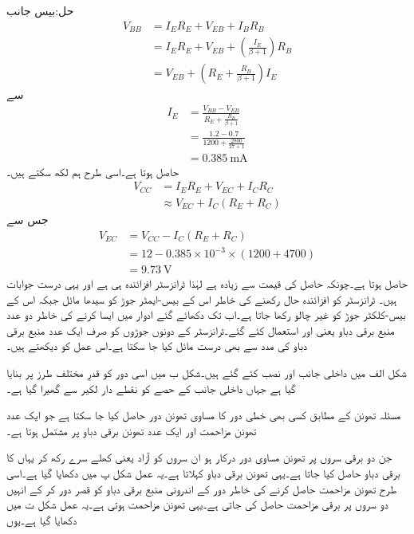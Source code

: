 حل:بیس جانب
\begin{align*}
V_{BB}&=I_E R_E+V_{EB}+I_B R_B\\
&=I_E R_E +V_{EB}+\left(\frac{I_E}{\beta+1} \right)R_B\\
&=V_{EB}+\left(R_E+\frac{R_B}{\beta+1} \right) I_E
\end{align*}
سے
\begin{align*}
I_E&=\frac{V_{BB}-V_{EB}}{R_E+\frac{R_B}{\beta+1}}\\
&=\frac{1.2-0.7}{1200+\frac{2800}{27+1}}\\
&=\SI{0.385}{\milli \ampere}
\end{align*}
حاصل ہوتا ہے۔اسی طرح ہم لکھ سکتے ہیں۔
\begin{align*}
V_{CC}&=I_E R_E +V_{EC}+I_C R_C\\
&\approx V_{EC}+I_C \left(R_E+R_C \right)
\end{align*}
جس سے
\begin{align*}
V_{EC}&=V_{CC}-I_C \left(R_E+R_C \right)\\
&=12-0.385 \times 10^{-3} \times \left(1200+4700 \right)\\
&=\SI{9.73}{\volt}
\end{align*}
حاصل ہوتا ہے۔چونکہ حاصل  کی قیمت  سے زیادہ ہے لہٰذا ٹرانزسٹر افزائندہ ہی ہے اور یہی درست جوابات ہیں۔ 
ٹرانزسٹر کو افزائندہ حال  رکھنے کی خاطر اس کے بیس-ایمٹر  جوڑ کو سیدھا مائل جبکہ اس کے بیس-کلکٹر جوڑ کو غیر چالو رکھا جاتا ہے۔اب تک دکھائے گئے ادوار میں ایسا کرنے کی خاطر دو عدد منبع برقی دباو یعنی  اور   استعمال کئے گئے۔ٹرانزسٹر کے دونوں جوڑوں کو صرف ایک عدد منبع برقی دباو کی مدد سے بھی درست مائل کیا جا سکتا ہے۔اس عمل کو دیکھتے ہیں۔

شکل  الف میں داخلی جانب   اور  نصب کئے گئے ہیں۔شکل  ب میں اسی دور کو قدرِ مختلف طرز پر بنایا گیا ہے جہاں داخلی جانب کے حصے کو نقطے دار لکیر سے گھیرا گیا ہے۔

مسئلہ تھونن  کے مطابق کسی بھی خطی دور کا مساوی تھونن دور حاصل کیا جا سکتا ہے جو ایک عدد تھونن مزاحمت   اور ایک عدد تھونن برقی دباو  پر مشتمل ہوتا ہے۔

جن دو برقی سروں پر تھونن مساوی دور درکار ہو ان سروں کو آزاد یعنی کھلے سرے  رکھ کر یہاں کا برقی دباو حاصل کیا جاتا ہے۔یہی تھونن برقی دباو  کہلاتا ہے۔یہ عمل شکل  پ میں دکھایا گیا ہے۔اسی طرح تھونن مزاحمت   حاصل کرنے کی خاطر دور کے اندرونی منبع برقی دباو  کو قصر دور  کر کے انہیں دو سروں پر برقی مزاحمت حاصل کی جاتی ہے۔یہی تھونن مزاحمت ہوتی ہے۔یہ عمل شکل  ت میں دکھایا گیا ہے۔یوں

